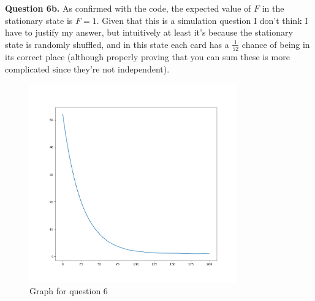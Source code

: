 \documentclass[letterpaper, reqno,11pt]{article}
\begin{document}
{\medskip\noindent\bf Question 6b.} As confirmed with the code, the expected value of $F$ in the stationary state is $F=1$. Given that this is a simulation question I don't think I have to justify my answer, but intuitively at least it's because the stationary state is randomly shuffled, and in this state each card has a $\frac{1}{52}$ chance of being in its correct place (although properly proving that you can sum these is more complicated since they're not independent).

\begin{figure}[htpb]
    \centering
    \includegraphics[width=0.8\textwidth]{q6}
    \caption{Graph for question 6}
    \label{fig:q6}
\end{figure}
\end{document}
